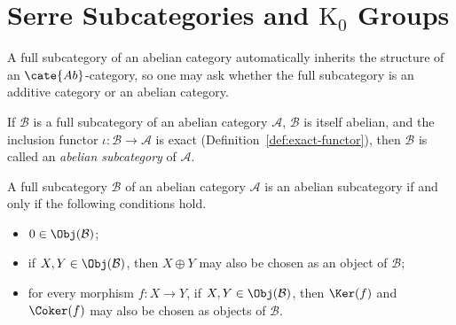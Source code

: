 
\section{Serre Subcategories and \texorpdfstring{$\mathrm{K}_0$}{K0} Groups}\label{sec:Serre-subcat}
\hypertarget{o014.aljabr2.chapter2.serre-subcategories-and-k0-groups}{ }

A full subcategory of an abelian category automatically inherits the structure
of an $\cate{Ab}$-category, so one may ask whether the full subcategory is an
additive category or an abelian category.

\begin{definition}
If $\mathcal{B}$ is a full subcategory of an abelian category $\mathcal{A}$,
$\mathcal{B}$ is itself abelian, and the inclusion functor
$\iota:\mathcal{B}\to\mathcal{A}$ is exact
(Definition~\ref{def:exact-functor}), then $\mathcal{B}$ is called an
\emph{abelian subcategory} of $\mathcal{A}$.
\end{definition}

\begin{proposition}\label{prop:Abel-subcat}
A full subcategory $\mathcal{B}$ of an abelian category $\mathcal{A}$ is an
abelian subcategory if and only if the following conditions hold.
\begin{itemize}
	\item $0\in\Obj(\mathcal{B})$;
	\item if $X,Y\in\Obj(\mathcal{B})$, then $X\oplus Y$ may also be chosen as
	an object of $\mathcal{B}$;
	\item for every morphism $f:X\to Y$, if
	$X,Y\in\Obj(\mathcal{B})$, then $\Ker(f)$ and $\Coker(f)$ may also be
	chosen as objects of $\mathcal{B}$.
\end{itemize}
\end{proposition}

